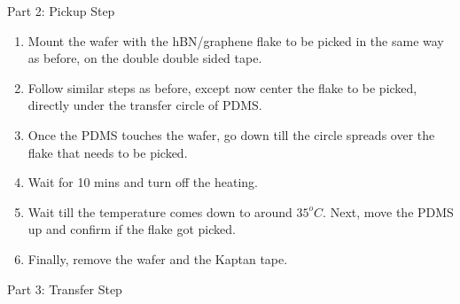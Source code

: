Part 2: Pickup Step
\begin{enumerate}
\item Mount the wafer with the hBN/graphene flake to be picked in the same way as before, on the double double sided tape.
\item Follow similar steps as before, except now center the flake to be picked, directly under the transfer circle of PDMS.
\item Once the PDMS touches the wafer, go down till the circle spreads over the flake that needs to be picked.
\item Wait for 10 mins and turn off the heating.
\item Wait till the temperature comes down to around $35 ^o C$. Next, move the PDMS up and confirm if the flake got picked.
\item Finally, remove the wafer and the Kaptan tape.
\end{enumerate}

Part 3: Transfer Step

